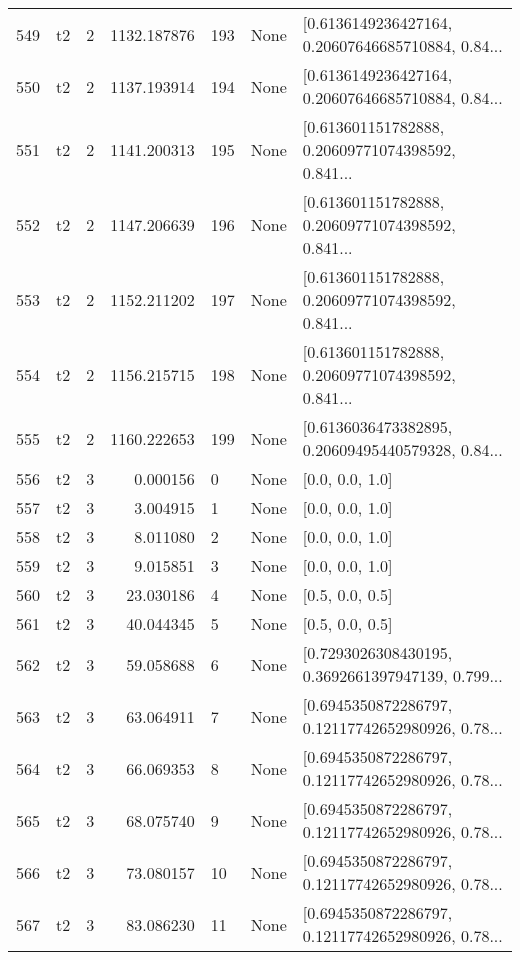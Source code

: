 \begin{tabular}{lllrlll}
549 &  t2 &   2 &  1132.187876 &  193 &  None &  [0.6136149236427164, 0.20607646685710884, 0.84... \\
550 &  t2 &   2 &  1137.193914 &  194 &  None &  [0.6136149236427164, 0.20607646685710884, 0.84... \\
551 &  t2 &   2 &  1141.200313 &  195 &  None &  [0.613601151782888, 0.20609771074398592, 0.841... \\
552 &  t2 &   2 &  1147.206639 &  196 &  None &  [0.613601151782888, 0.20609771074398592, 0.841... \\
553 &  t2 &   2 &  1152.211202 &  197 &  None &  [0.613601151782888, 0.20609771074398592, 0.841... \\
554 &  t2 &   2 &  1156.215715 &  198 &  None &  [0.613601151782888, 0.20609771074398592, 0.841... \\
555 &  t2 &   2 &  1160.222653 &  199 &  None &  [0.6136036473382895, 0.20609495440579328, 0.84... \\
556 &  t2 &   3 &     0.000156 &    0 &  None &                                    [0.0, 0.0, 1.0] \\
557 &  t2 &   3 &     3.004915 &    1 &  None &                                    [0.0, 0.0, 1.0] \\
558 &  t2 &   3 &     8.011080 &    2 &  None &                                    [0.0, 0.0, 1.0] \\
559 &  t2 &   3 &     9.015851 &    3 &  None &                                    [0.0, 0.0, 1.0] \\
560 &  t2 &   3 &    23.030186 &    4 &  None &                                    [0.5, 0.0, 0.5] \\
561 &  t2 &   3 &    40.044345 &    5 &  None &                                    [0.5, 0.0, 0.5] \\
562 &  t2 &   3 &    59.058688 &    6 &  None &  [0.7293026308430195, 0.3692661397947139, 0.799... \\
563 &  t2 &   3 &    63.064911 &    7 &  None &  [0.6945350872286797, 0.12117742652980926, 0.78... \\
564 &  t2 &   3 &    66.069353 &    8 &  None &  [0.6945350872286797, 0.12117742652980926, 0.78... \\
565 &  t2 &   3 &    68.075740 &    9 &  None &  [0.6945350872286797, 0.12117742652980926, 0.78... \\
566 &  t2 &   3 &    73.080157 &   10 &  None &  [0.6945350872286797, 0.12117742652980926, 0.78... \\
567 &  t2 &   3 &    83.086230 &   11 &  None &  [0.6945350872286797, 0.12117742652980926, 0.78... \\

\end{tabular}
